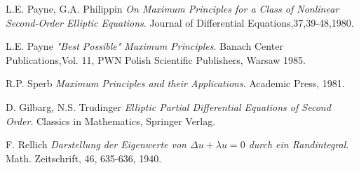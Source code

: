 \documentclass[11pt,a4paper]{article}
\begin{document}
\begin{thebibliography}{9}

  L.E. Payne, G.A. Philippin
  \emph{On Maximum Principles for a Class of Nonlinear Second-Order Elliptic Equations}.
  Journal of Differential Equations,37,39-48,1980.

  L.E. Payne
  \emph{"Best Possible" Maximum Principles}.
  Banach Center Publications,Vol. 11,
  PWN Polish Scientific Publishers, Warsaw 1985.
  
  R.P. Sperb
  \emph{Maximum Principles and their Applications}.
  Academic Press, 1981.

  D. Gilbarg, N.S. Trudinger
  \emph{Elliptic Partial Differential Equations of Second Order}.
  Classics in Mathematics,
  Springer Verlag.	
  
  F. Rellich
  \emph{Darstellung der Eigenwerte von $\Delta u + \lambda u=0$ durch ein Randintegral}.
  Math. Zeitschrift, 46,
  635-636, 1940.	

\end{thebibliography}
\end{document}
